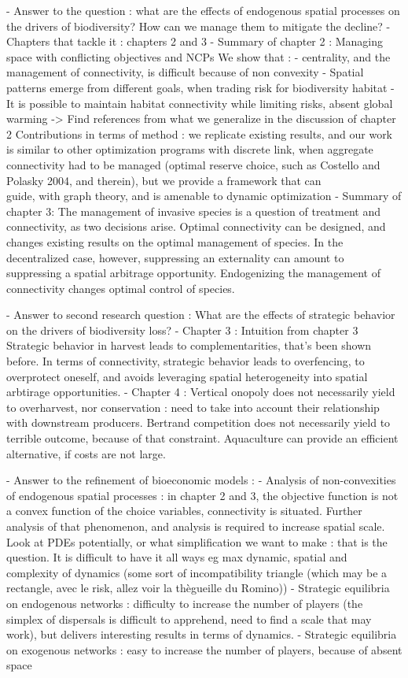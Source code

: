 - Answer to the question : what are the effects of endogenous spatial processes on the drivers of biodiversity? How can we manage them to mitigate the decline? 
	- Chapters that tackle it : chapters 2 and 3
	- Summary of chapter 2 : 
		Managing space with conflicting objectives and NCPs
		We show that : 
			- centrality, and the management of connectivity, is difficult because of non convexity
		    - Spatial patterns emerge from different goals, when trading risk for biodiversity habitat
		    - It is possible to maintain habitat connectivity while limiting risks, absent global warming
		    -> Find references from what we generalize in the discussion of chapter 2
		 Contributions in terms of method : we replicate existing results, and our work is similar to other optimization programs with discrete link, 
		 when aggregate connectivity had to be managed (optimal reserve choice, such as Costello and Polasky 2004, and therein), but we provide a framework that can\\
		 guide, with graph theory, and is amenable to dynamic optimization
	- Summary of chapter 3: 
		The management of invasive species is a question of treatment and connectivity, as two decisions arise. Optimal connectivity can be designed, and changes existing
		results on the optimal management of species. In the decentralized case, however, suppressing an externality can amount to suppressing a spatial arbitrage
		opportunity. Endogenizing the management of connectivity changes optimal control of species.

- Answer to second research question : What are the effects of strategic behavior on the drivers of biodiversity loss? 
	- Chapter 3 : Intuition from chapter 3
		Strategic behavior in harvest leads to complementarities, that's been shown before. In terms of connectivity, strategic behavior leads to overfencing, to overprotect oneself, and avoids leveraging spatial heterogeneity into spatial arbtirage opportunities. 
	- Chapter 4 : 
		Vertical onopoly does not necessarily yield to overharvest, nor conservation : need to take into account their relationship with downstream producers. 
		Bertrand competition does not necessarily yield to terrible outcome, because of that constraint. Aquaculture can provide an efficient alternative, if costs are not large. 

- Answer to the refinement of bioeconomic models :
	- Analysis of non-convexities of endogenous spatial processes : in chapter 2 and 3, the objective function is not a convex function of the choice variables, connectivity is situated. Further analysis of that phenomenon, and analysis is required to increase spatial scale. Look at PDEs potentially, or what simplification we want to make : that is the question. It is difficult to have it all ways eg max dynamic, spatial and complexity of dynamics (some sort of incompatibility triangle (which may be a rectangle, avec le risk, allez voir la thègueille du Romino))
	- Strategic equilibria on endogenous networks : difficulty to increase the number of players (the simplex of dispersals is difficult to apprehend, need to find a scale that may work), but delivers interesting results in terms of dynamics. 
	- Strategic equilibria on exogenous networks : easy to increase the number of players, because of absent space

